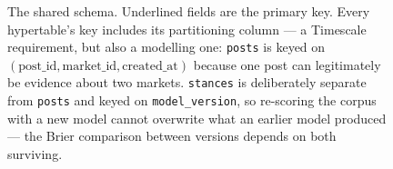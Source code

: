 \documentclass[11pt]{article}
\newcommand{\code}[1]{\texttt{\small #1}}
\begin{document}
\begin{figure}[htbp]
\caption[The shared TimescaleDB schema]{The shared schema. Underlined fields are the primary key. Every
hypertable's key includes its partitioning column --- a Timescale requirement,
but also a modelling one: \code{posts} is keyed on
$(\text{post\_id}, \text{market\_id}, \text{created\_at})$ because one post can
legitimately be evidence about two markets. \code{stances} is deliberately
separate from \code{posts} and keyed on \code{model\_version}, so re-scoring the
corpus with a new model cannot overwrite what an earlier model produced --- the
Brier comparison between versions depends on both surviving.}
\label{fig:schema}
\end{figure}
\end{document}
